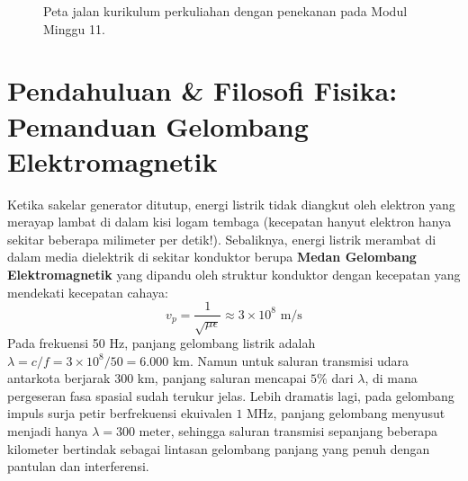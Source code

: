\documentclass[11pt,a4paper]{article}
\theoremstyle{definition}
\begin{document}
\begin{figure}[htbp]
{%
}
\caption{Peta jalan kurikulum perkuliahan dengan penekanan pada Modul Minggu 11.}
\label{fig:peta_jalan_pd_w11}
\end{figure}

\section{Pendahuluan \& Filosofi Fisika: Pemanduan Gelombang Elektromagnetik}

Ketika sakelar generator ditutup, energi listrik tidak diangkut oleh elektron yang merayap lambat di dalam kisi logam tembaga (kecepatan hanyut elektron hanya sekitar beberapa milimeter per detik!). Sebaliknya, energi listrik merambat di dalam media dielektrik di sekitar konduktor berupa \textbf{Medan Gelombang Elektromagnetik} yang dipandu oleh struktur konduktor dengan kecepatan yang mendekati kecepatan cahaya:
\begin{equation}
    v_p = \frac{1}{\sqrt{\mu \epsilon}} \approx 3 \times 10^8\text{ m/s}
\end{equation}
Pada frekuensi 50 Hz, panjang gelombang listrik adalah $\lambda = c/f = 3 \times 10^8 / 50 = 6.000\text{ km}$. Namun untuk saluran transmisi udara antarkota berjarak $300\text{ km}$, panjang saluran mencapai $5\%$ dari $\lambda$, di mana pergeseran fasa spasial sudah terukur jelas. Lebih dramatis lagi, pada gelombang impuls surja petir berfrekuensi ekuivalen $1\text{ MHz}$, panjang gelombang menyusut menjadi hanya $\lambda = 300\text{ meter}$, sehingga saluran transmisi sepanjang beberapa kilometer bertindak sebagai lintasan gelombang panjang yang penuh dengan pantulan dan interferensi.
\end{document}
